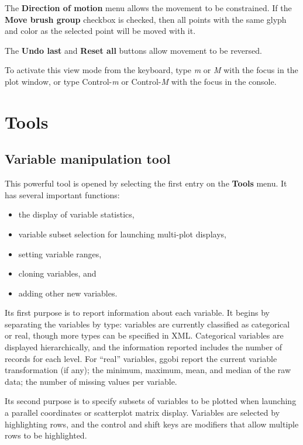 \documentclass[11pt]{article}
\begin{document}
The {\bf Direction of motion} menu allows the movement to be
constrained.  If the {\bf Move brush group} checkbox is
checked, then all points with the same glyph and color as
the selected point will be moved with it.

The {\bf Undo last} and {\bf Reset all} buttons allow movement
to be reversed.

To activate this view mode from the keyboard, type {\em m} or {\em M}
with the focus in the plot window, or type Control-{\em m} or
Control-{\em M} with the focus in the console.

\newpage
\section{Tools}
\label{Tools}

\subsection{Variable manipulation tool}
\label{slbl:VarManip}

This powerful tool is opened by selecting the first entry on the
{\bf Tools} menu.  It has several important functions:
\begin{itemize} \itemsep 0em
\item the display of variable statistics,
\item variable subset selection for launching multi-plot displays,
\item setting variable ranges,
\item cloning variables, and
\item adding other new variables.
\end{itemize}

Its first purpose is to report information about each variable.
It begins by separating the variables by type: variables are
currently classified as categorical or real, though more types
can be specified in XML.  Categorical variables are displayed
hierarchically, and the information reported includes the number
of records for each level.  For ``real'' variables, ggobi report
the current variable transformation (if any); the minimum,
maximum, mean, and median of the raw data; the number of missing values
per variable.

Its second purpose is to specify subsets of variables to be plotted
when launching a parallel coordinates or scatterplot matrix display.
Variables are selected by highlighting rows, and the control and shift
keys are modifiers that allow multiple rows to be highlighted.
\end{document}
